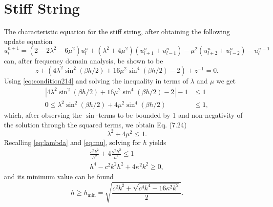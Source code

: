 \documentclass{article}
\begin{document}
\section{Stiff String}
The characteristic equation for the stiff string, after obtaining the following update equation
\begin{equation}
    u_l^{n+1}=(2-2\lambda^2-6\mu^2)u_l^n+(\lambda^2+4\mu^2)(u_{l+1}^n+u_{l-1}^n)-\mu^2(u_{l+2}^n+u_{l-2}^n)-u_l^{n-1}
\end{equation}
can, after frequency domain analysis, be shown to be
\begin{equation}
    z + (4\lambda^2\sin^2(\beta h/2)+16\mu^2\sin^4(\beta h/2)-2) +z^{-1} = 0.
\end{equation}
Using \eqref{eq:condition214} and solving the inequality in terms of $\lambda$ and $\mu$ we get
\begin{equation}\nonumber
    \begin{aligned}
    |4\lambda^2\sin^2(\beta h/2)+16\mu^2\sin^4(\beta h/2)-2|-1&\leq 1\\
    0\leq\lambda^2\sin^2(\beta h/2)+4\mu^2\sin^4(\beta h/2)&\leq 1,
    \end{aligned}
\end{equation}
which, after observing the $\sin$-terms to be bounded by 1 and non-negativity of the solution through the squared terms, we obtain Eq. (7.24)
\begin{equation}
    \lambda^2+4\mu^2\leq 1.
\end{equation}
Recalling \eqref{eq:lambda} and \eqref{eq:mu}, solving for $h$ yields
\begin{equation}
    \begin{aligned}
        \frac{c^2k^2}{h^2} + 4 \frac{\kappa^2h^2}{h^4}\leq 1\\
        h^4 - c^2k^2h^2+4\kappa^2k^2 \geq 0,
    \end{aligned}
\end{equation}
and its minimum value can be found
\begin{equation}
    h \geq h_\text{min} = \sqrt{\frac{c^2k^2+\sqrt{c^4k^4-16\kappa^2k^2}}{2}}.
\end{equation}
\end{document}
